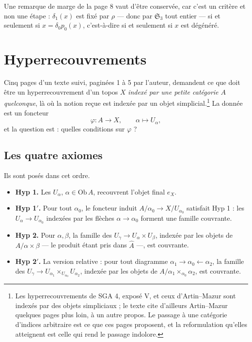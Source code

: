 \documentclass[11pt,a4paper]{article}
\begin{document}
Une remarque de marge de la page 8 vaut d'être conservée, car c'est un critère
et non une étape : $\delta_{1}(x)$ est fixé par $\rho$ — donc par
$\mathfrak{S}_{3}$ tout entier — si et seulement si $x = \delta_{0}p_{0}(x)$,
c'est-à-dire si et seulement si $x$ est dégénéré.

\section*{Hyperrecouvrements}

Cinq pages d'un texte suivi, paginées 1 à 5 par l'auteur, demandent ce que doit
être un hyperrecouvrement d'un topos $X$ \emph{indexé par une petite catégorie
$A$ quelconque}, là où la notion reçue est indexée par un objet
simplicial.\footnote{Les hyperrecouvrements de SGA 4, exposé V, et ceux
d'Artin--Mazur sont indexés par des objets simpliciaux ; le texte cite d'ailleurs
Artin--Mazur quelques pages plus loin, à un autre propos. Le passage à une
catégorie d'indices arbitraire est ce que ces pages proposent, et la
reformulation qu'elles atteignent est celle qui rend le passage indolore.}
La donnée est un foncteur
\[
  \varphi \colon A \longrightarrow X, \qquad \alpha \longmapsto U_{\alpha},
\]
et la question est : quelles conditions sur $\varphi$ ?

\subsection*{Les quatre axiomes}

Ils sont posés dans cet ordre.

\begin{itemize}
\item \textbf{Hyp 1.} Les $U_{\alpha}$, $\alpha \in \mathrm{Ob}\,A$, recouvrent
l'objet final $e_{X}$.
\item \textbf{Hyp 1${}'$.} Pour tout $\alpha_{0}$, le foncteur induit
$A/\alpha_{0} \to X/U_{\alpha_{0}}$ satisfait Hyp 1 : les
$U_{\alpha} \to U_{\alpha_{0}}$ indexées par les flèches $\alpha \to
\alpha_{0}$ forment une famille couvrante.
\item \textbf{Hyp 2.} Pour $\alpha, \beta$, la famille des
$U_{\gamma} \to U_{\alpha} \times U_{\beta}$, indexée par les objets de
$A/\alpha\times\beta$ — le produit étant pris dans $\widehat{A}$ —, est
couvrante.
\item \textbf{Hyp 2${}'$.} La version relative : pour tout diagramme
$\alpha_{1} \to \alpha_{0} \leftarrow \alpha_{2}$, la famille des
$U_{\gamma} \to U_{\alpha_{1}} \times_{U_{\alpha_{0}}} U_{\alpha_{2}}$,
indexée par les objets de $A/\alpha_{1}\times_{\alpha_{0}}\alpha_{2}$, est
couvrante.
\end{itemize}
\end{document}
